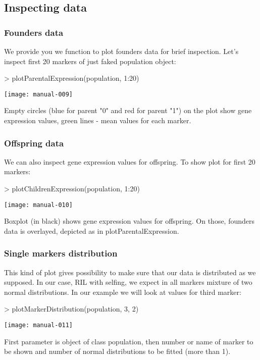 \documentclass{article}
\begin{document}
\subsection{Inspecting data}
\subsubsection{Founders data}
We provide you we function to plot founders data for brief inspection. Let's inspect first 20 markers of just faked population object:

\begin{Schunk}
\begin{Sinput}
> plotParentalExpression(population, 1:20)
\end{Sinput}
\end{Schunk}
\texttt{[image: manual-009]}

{\noindent}Empty circles (blue for parent "0" and red for parent "1") on the plot show gene expression values, green lines - mean values for each marker.
\newpage
\subsubsection{Offspring data}
We can also inspect gene expression values for offspring. To show plot for first 20 markers:
\begin{Schunk}
\begin{Sinput}
> plotChildrenExpression(population, 1:20)
\end{Sinput}
\end{Schunk}
\texttt{[image: manual-010]}

{\noindent}Boxplot (in black) shows gene expression values for offspring. On those, founders data is overlayed, depicted as in plotParentalExpression.
\newpage
\subsubsection{Single markers distribution}
This kind of plot gives possibility to make sure that our data is distributed as we supposed. In our case, RIL with selfing, we expect in all markers mixture of two normal distributions.
In our example we will look at values for third marker:
\begin{Schunk}
\begin{Sinput}
> plotMarkerDistribution(population, 3, 2)
\end{Sinput}
\end{Schunk}
\texttt{[image: manual-011]}

{\noindent}First parameter is object of class population, then number or name of marker to be shown and number of normal distributions to be fitted (more than 1).
\newpage
\end{document}
